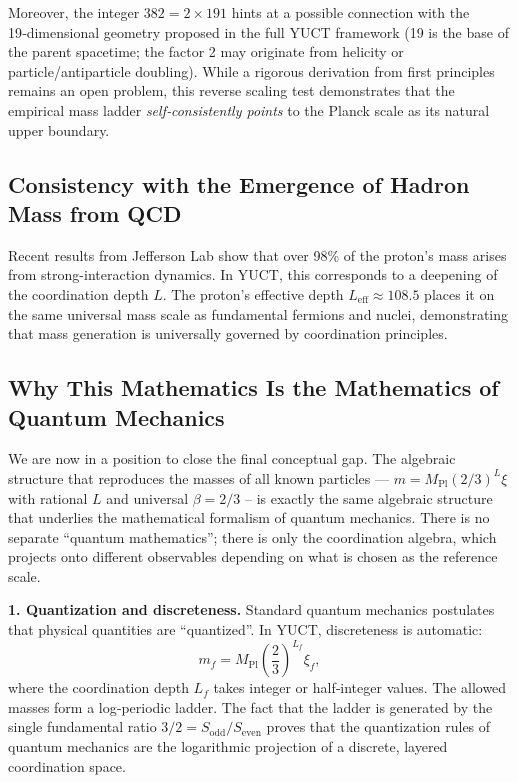 \documentclass[11pt,a4paper]{article}
\begin{document}
	Moreover, the integer $382 = 2 \times 191$ hints at a possible connection with the 19‑dimensional geometry proposed in the full YUCT framework (19 is the base of the parent spacetime; the factor 2 may originate from helicity or particle/antiparticle doubling). While a rigorous derivation from first principles remains an open problem, this reverse scaling test demonstrates that the empirical mass ladder \emph{self‑consistently points} to the Planck scale as its natural upper boundary.
	
	\subsection{Consistency with the Emergence of Hadron Mass from QCD}
	
	Recent results from Jefferson Lab show that over 98\% of the proton's mass arises from strong-interaction dynamics. In YUCT, this corresponds to a deepening of the coordination depth \(L\). The proton's effective depth \(L_{\mathrm{eff}} \approx 108.5\) places it on the same universal mass scale as fundamental fermions and nuclei, demonstrating that mass generation is universally governed by coordination principles.
	
\subsection{Why This Mathematics Is the Mathematics of Quantum Mechanics}
\label{subsec:QM-as-YUCT}

We are now in a position to close the final conceptual gap.  The algebraic
structure that reproduces the masses of all known particles ---
\(m = M_{\mathrm{Pl}}(2/3)^L\xi\) with rational $L$ and universal
$\beta=2/3$ -- is exactly the same algebraic structure that underlies
the mathematical formalism of quantum mechanics.  There is no separate
``quantum mathematics''; there is only the coordination algebra, which
projects onto different observables depending on what is chosen as the
reference scale.

\medskip
\noindent\textbf{1. Quantization and discreteness.}
Standard quantum mechanics postulates that physical quantities are
``quantized''.  In YUCT, discreteness is automatic:
\[
m_f = M_{\mathrm{Pl}} \left( \frac{2}{3} \right)^{L_f} \xi_f,
\]
where the coordination depth $L_f$ takes integer or half‑integer
values.  The allowed masses form a log‑periodic ladder.  The fact
that the ladder is generated by the single fundamental ratio
$3/2 = S_{\mathrm{odd}}/S_{\mathrm{even}}$ proves that the
quantization rules of quantum mechanics are the logarithmic
projection of a discrete, layered coordination space.
\end{document}
